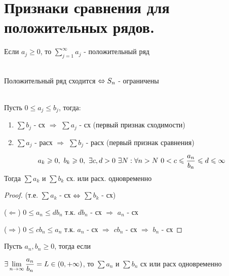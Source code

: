 \documentclass[matan]{subfiles}
\begin{document}
  \newpage
  \section{Признаки сравнения для положительных рядов.}

  \begin{definition}
      Если $a_j \geqslant 0$, то $\sum\limits_{j=1}^\infty a_j$ - положительный ряд
  \end{definition}

  \begin{theorem}\ \\
      Положительный ряд сходится $\Leftrightarrow S_n$ - ограничены
  \end{theorem}

  \begin{consequence} \ \\
      Пусть $0 \leqslant a_j \leqslant b_j$, тогда:
      \begin{enumerate}
          \item $\sum b_j$ - сх $\Rightarrow$ $\sum a_j$ - сх (первый признак сходимости)
          \item $\sum a_j$ - расх $\Rightarrow$ $\sum b_j$ - расх (первый признак сравнения)
      \end{enumerate}
  \end{consequence}

  \begin{Consequence}
      \[a_k \geqslant 0,\ b_k \geqslant 0,\ \exists c,d > 0\ \exists N: \forall n > N\ 0 < c \leqslant \frac{a_n}{b_n} \leqslant d \leqslant \infty\]
      Тогда $\sum a_k$ и $\sum b_k$ сх. или расх. одновременно
  \end{Consequence}

  \begin{proof}
      (т.е. $\sum a_k$ - сх $\Leftrightarrow$ $\sum b_k$ - сх)

      ($\Leftarrow$) $0 \leqslant a_n \leqslant d b_n$ т.к. $d b_n$ - сх $\Rightarrow$ $a_n$ - сх

      ($\Rightarrow$) $0 \leqslant c b_n \leqslant a_n$ т.к. $a_n$ - сх $\Rightarrow$ $c b_n$ - сх $\Rightarrow$ $b_n$ - сх
  \end{proof}

  \begin{consequence} 
      Пусть $a_n, b_n \geqslant 0$, тогда если

      $\exists \lim\limits_{n \rightarrow \infty} \dfrac{a_n}{b_n} = L \in (0, + \infty)$, то $\sum a_n$ и $\sum b_n$ сх или расх одновременно
  \end{consequence}
\end{document}
